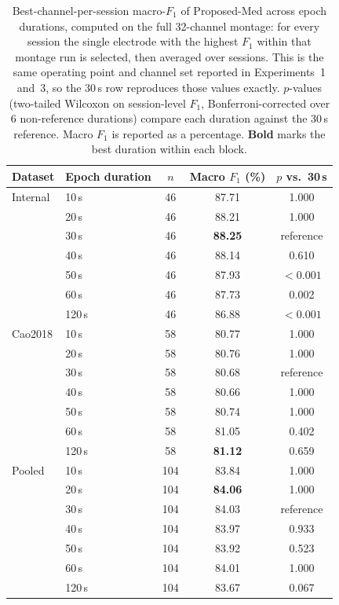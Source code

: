 \begin{table}[ht]
  \centering
  \caption{Best-channel-per-session macro-$F_1$ of Proposed-Med across epoch durations, computed on the full 32-channel montage: for every session the single electrode with the highest $F_1$ within that montage run is selected, then averaged over sessions. This is the same operating point and channel set reported in Experiments~1 and~3, so the 30\,s row reproduces those values exactly. $p$-values (two-tailed Wilcoxon on session-level $F_1$, Bonferroni-corrected over 6 non-reference durations) compare each duration against the 30\,s reference. Macro $F_1$ is reported as a percentage. \textbf{Bold} marks the best duration within each block.}
  \label{tab:epoch_duration}
  \begin{tabular}{llccc}
    \toprule
    Dataset & Epoch duration & $n$ & Macro $F_1$ (\%) & $p$ vs.\ 30\,s \\
    \midrule
    Internal & 10\,s & 46 & 87.71 & 1.000 \\
     & 20\,s & 46 & 88.21 & 1.000 \\
     & 30\,s & 46 & \textbf{88.25} & reference \\
     & 40\,s & 46 & 88.14 & 0.610 \\
     & 50\,s & 46 & 87.93 & $<0.001$ \\
     & 60\,s & 46 & 87.73 & 0.002 \\
     & 120\,s & 46 & 86.88 & $<0.001$ \\
    \midrule
    Cao2018 & 10\,s & 58 & 80.77 & 1.000 \\
     & 20\,s & 58 & 80.76 & 1.000 \\
     & 30\,s & 58 & 80.68 & reference \\
     & 40\,s & 58 & 80.66 & 1.000 \\
     & 50\,s & 58 & 80.74 & 1.000 \\
     & 60\,s & 58 & 81.05 & 0.402 \\
     & 120\,s & 58 & \textbf{81.12} & 0.659 \\
    \midrule
    Pooled & 10\,s & 104 & 83.84 & 1.000 \\
     & 20\,s & 104 & \textbf{84.06} & 1.000 \\
     & 30\,s & 104 & 84.03 & reference \\
     & 40\,s & 104 & 83.97 & 0.933 \\
     & 50\,s & 104 & 83.92 & 0.523 \\
     & 60\,s & 104 & 84.01 & 1.000 \\
     & 120\,s & 104 & 83.67 & 0.067 \\
    \bottomrule
  \end{tabular}
\end{table}
